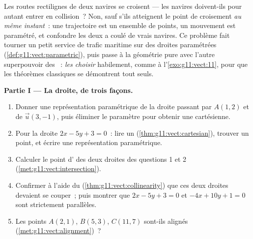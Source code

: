 \begin{problem}
\label{pb:g11:vect:1}
Les routes rectilignes de deux navires se croisent --- les navires
doivent-ils pour autant entrer en collision~? Non, sauf s'ils
atteignent le point de croisement \emph{au même instant}~: une
trajectoire est un ensemble de points, un mouvement est
paramétré, et confondre les deux a coulé de vrais navires. Ce
problème fait tourner un petit service de trafic maritime sur des
droites paramétrées (\cref{def:g11:vect:parametric}), puis passe à la
géométrie pure avec l'autre superpouvoir des ~:
\emph{les choisir} habilement, comme à l'\cref{exo:g11:vect:11},
pour que les théorèmes classiques se démontrent tout seuls.

\medskip
\noindent\textbf{Partie I --- La droite, de trois façons.}
\begin{enumerate}
  \item Donner une représentation paramétrique de la droite passant
        par $A(1, 2)$ et de  $\vec u(3, -1)$, puis
        éliminer le paramètre pour obtenir une 
        cartésienne.
  \item Pour la droite $2x - 5y + 3 = 0$~: lire un  (\cref{thm:g11:vect:cartesian}), trouver un point,
        et écrire une représentation paramétrique.
  \item Calculer le point d' des deux droites des
        questions 1 et 2 (\cref{met:g11:vect:intersection}).
  \item Confirmer à l'aide du 
        (\cref{thm:g11:vect:collinearity}) que ces deux droites
        devaient se couper~; puis montrer que $2x - 5y + 3 = 0$ et
        $-4x + 10y + 1 = 0$ sont strictement parallèles.
  \item Les points $A(2, 1)$, $B(5, 3)$, $C(11, 7)$ sont-ils
        alignés (\cref{met:g11:vect:alignment})~?
\end{enumerate}


\end{problem}
